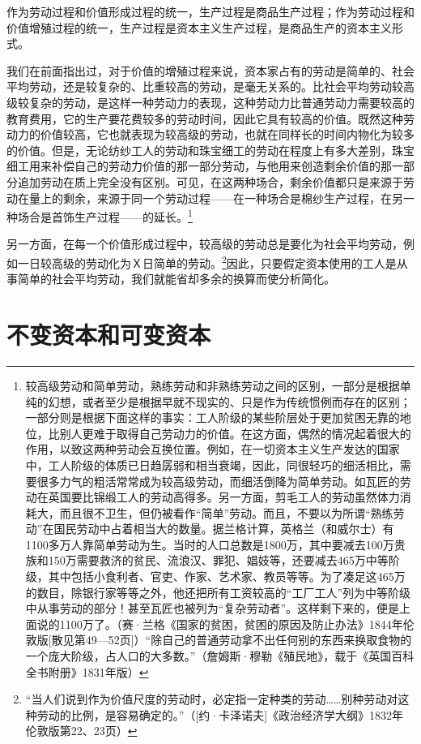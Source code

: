 \documentclass{ctexbook}
\begin{document}
    作为劳动过程和价值形成过程的统一，生产过程是商品生产过程；作为劳动过程和价值增殖过程的统一，生产过程是资本主义生产过程，是商品生产的资本主义形式。
    
    我们在前面指出过，对于价值的增殖过程来说，资本家占有的劳动是简单的、社会平均劳动，还是较复杂的、比重较高的劳动，是毫无关系的。比社会平均劳动较高级较复杂的劳动，是这样一种劳动力的表现，这种劳动力比普通劳动力需要较高的教育费用，它的生产要花费较多的劳动时间，因此它具有较高的价值。既然这种劳动力的价值较高，它也就表现为较高级的劳动，也就在同样长的时间内物化为较多的价值。但是，无论纺纱工人的劳动和珠宝细工的劳动在程度上有多大差别，珠宝细工用来补偿自己的劳动力价值的那一部分劳动，与他用来创造剩余价值的那一部分追加劳动在质上完全没有区别。可见，在这两种场合，剩余价值都只是来源于劳动在量上的剩余，来源于同一个劳动过程——在一种场合是棉纱生产过程，在另一种场合是首饰生产过程——的延长。\footnote{较高级劳动和简单劳动，熟练劳动和非熟练劳动之间的区别，一部分是根据单纯的幻想，或者至少是根据早就不现实的、只是作为传统惯例而存在的区别；一部分则是根据下面这样的事实：工人阶级的某些阶层处于更加贫困无靠的地位，比别人更难于取得自己劳动力的价值。在这方面，偶然的情况起着很大的作用，以致这两种劳动会互换位置。例如，在一切资本主义生产发达的国家中，工人阶级的体质已日趋孱弱和相当衰竭，因此，同很轻巧的细活相比，需要很多力气的粗活常常成为较高级劳动，而细活倒降为简单劳动。如瓦匠的劳动在英国要比锦缎工人的劳动高得多。另一方面，剪毛工人的劳动虽然体力消耗大，而且很不卫生，但仍被看作“简单”劳动。而且，不要以为所谓“熟练劳动”在国民劳动中占着相当大的数量。据兰格计算，英格兰（和威尔士）有1100多万人靠简单劳动为生。当时的人口总数是1800万，其中要减去100万贵族和150万需要救济的贫民、流浪汉、罪犯、娼妓等，还要减去465万中等阶级，其中包括小食利者、官吏、作家、艺术家、教员等等。为了凑足这465万的数目，除银行家等等之外，他还把所有工资较高的“工厂工人”列为中等阶级中从事劳动的部分！甚至瓦匠也被列为“复杂劳动者”。这样剩下来的，便是上面说的1100万了。（赛·兰格《国家的贫困，贫困的原因及防止办法》1844年伦敦版[散见第49—52页]）“除自己的普通劳动拿不出任何别的东西来换取食物的一个庞大阶级，占人口的大多数。”（詹姆斯·穆勒《殖民地》，载于《英国百科全书附册》1831年版）}
    
    另一方面，在每一个价值形成过程中，较高级的劳动总是要化为社会平均劳动，例如一日较高级的劳动化为Ｘ日简单的劳动。\footnote{“当人们说到作为价值尺度的劳动时，必定指一定种类的劳动……别种劳动对这种劳动的比例，是容易确定的。”（[约·卡泽诺夫]《政治经济学大纲》1832年伦敦版第22、23页）}因此，只要假定资本使用的工人是从事简单的社会平均劳动，我们就能省却多余的换算而使分析简化。

\chapter{不变资本和可变资本}
\end{document}
